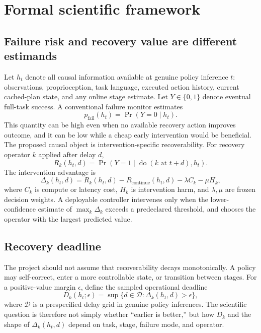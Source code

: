 \section{Formal scientific framework}

\subsection{Failure risk and recovery value are different estimands}

Let $h_t$ denote all causal information available at genuine policy inference $t$: observations, proprioception, task language, executed action history, current cached-plan state, and any online stage estimate. Let $Y\in\{0,1\}$ denote eventual full-task success. A conventional failure monitor estimates
\begin{equation}
  p_{\mathrm{fail}}(h_t) = \Pr(Y=0\mid h_t).
\end{equation}
This quantity can be high even when no available recovery action improves outcome, and it can be low while a cheap early intervention would be beneficial. The proposed causal object is intervention-specific recoverability. For recovery operator $k$ applied after delay $d$,
\begin{equation}
  R_k(h_t,d) = \Pr\!(Y=1\mid \operatorname{do}(k\text{ at }t+d),h_t).
  \label{eq:recoverability}
\end{equation}
The intervention advantage is
\begin{equation}
  \Delta_k(h_t,d)
  = R_k(h_t,d)-R_{\mathrm{continue}}(h_t,d)
  -\lambda C_k-\mu H_k,
  \label{eq:advantage}
\end{equation}
where $C_k$ is compute or latency cost, $H_k$ is intervention harm, and $\lambda,\mu$ are frozen decision weights. A deployable controller intervenes only when the lower-confidence estimate of $\max_k\Delta_k$ exceeds a predeclared threshold, and chooses the operator with the largest predicted value.

\subsection{Recovery deadline}

The project should not assume that recoverability decays monotonically. A policy may self-correct, enter a more controllable state, or transition between stages. For a positive-value margin $\epsilon$, define the sampled operational deadline
\begin{equation}
  D_k(h_t;\epsilon)
  = \sup\{d\in\mathcal{D}:\Delta_k(h_t,d)>\epsilon\},
  \label{eq:deadline}
\end{equation}
where $\mathcal{D}$ is a prespecified delay grid in genuine policy inferences. The scientific question is therefore not simply whether ``earlier is better,'' but how $D_k$ and the shape of $\Delta_k(h_t,d)$ depend on task, stage, failure mode, and operator.

